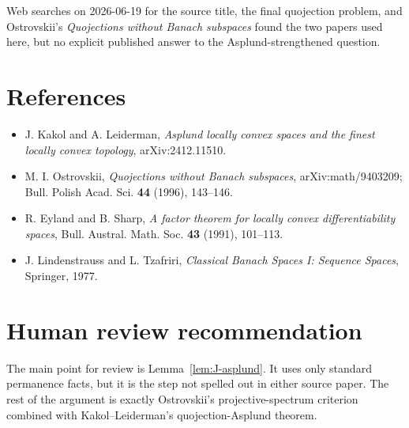 \documentclass[11pt]{article}
\begin{document}
Web searches on 2026-06-19 for the source title, the final quojection problem,
and Ostrovskii's \emph{Quojections without Banach subspaces} found the two
papers used here, but no explicit published answer to the Asplund-strengthened
question.

\section*{References}

\begin{itemize}
\item J. Kakol and A. Leiderman, \emph{Asplund locally convex spaces and the
finest locally convex topology}, arXiv:2412.11510.
\item M. I. Ostrovskii, \emph{Quojections without Banach subspaces},
arXiv:math/9403209; Bull. Polish Acad. Sci. \textbf{44} (1996), 143--146.
\item R. Eyland and B. Sharp, \emph{A factor theorem for locally convex
differentiability spaces}, Bull. Austral. Math. Soc. \textbf{43} (1991),
101--113.
\item J. Lindenstrauss and L. Tzafriri, \emph{Classical Banach Spaces I:
Sequence Spaces}, Springer, 1977.
\end{itemize}

\section*{Human review recommendation}

The main point for review is Lemma~\ref{lem:J-asplund}.  It uses only standard
permanence facts, but it is the step not spelled out in either source paper.
The rest of the argument is exactly Ostrovskii's projective-spectrum criterion
combined with Kakol--Leiderman's quojection-Asplund theorem.
\end{document}

